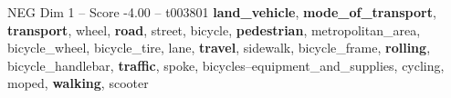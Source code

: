 \begin{textsample}{NEG Dim 1 – Score -4.00 – t003801}  \label{ex:f1_neg_017}
\textbf{land\_vehicle}, \textbf{mode\_of\_transport}, \textbf{transport}, wheel, \textbf{road}, street, bicycle, \textbf{pedestrian}, metropolitan\_area, bicycle\_wheel, bicycle\_tire, lane, \textbf{travel}, sidewalk, bicycle\_frame, \textbf{rolling}, bicycle\_handlebar, \textbf{traffic}, spoke, bicycles--equipment\_and\_supplies, cycling, moped, \textbf{walking}, scooter

\end{textsample}
